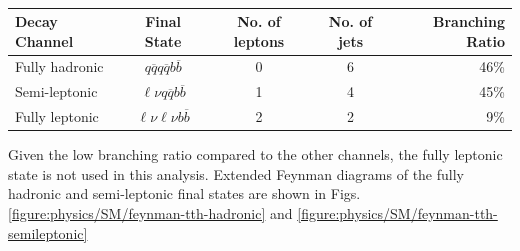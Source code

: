 \begin{table}[h]
\centering
	\begin{tabular}{ l c c c r }
	\hline \hline
	Decay Channel & Final State & No. of leptons & No. of jets & Branching Ratio \\ \hline \hline
	Fully hadronic & $q\overline{q}q\overline{q}b\overline{b}$ & 0 & 6 & 46\% \\ \hline
	Semi-leptonic &  $\ell \nu q\overline{q}b\overline{b}$ & 1 & 4 & 45\% \\ \hline
	Fully leptonic & $\ell \nu \ell \nu b\overline{b}$ & 2 & 2 & 9\% \\ \hline 
	\end{tabular}
	\caption{ }
	\label{table:physics/final-states}
\end{table}

Given the low branching ratio compared to the other channels, the fully leptonic state is not used in this analysis. Extended Feynman diagrams of the fully hadronic and semi-leptonic final states are shown in Figs. \ref{figure:physics/SM/feynman-tth-hadronic} and \ref{figure:physics/SM/feynman-tth-semileptonic}

